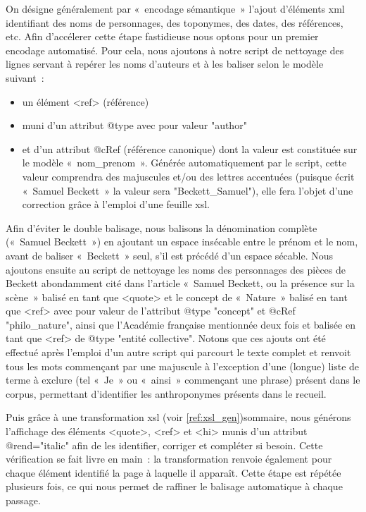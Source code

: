 \documentclass[12pt, a4paper]{article}
\begin{document}
On désigne généralement par «~encodage sémantique~» l'ajout d'éléments xml identifiant des noms de personnages, des toponymes, des dates, des références, etc. Afin d'accélerer cette étape fastidieuse nous optons pour un premier encodage automatisé. Pour cela, nous ajoutons à notre script de nettoyage des lignes servant à repérer les noms d'auteurs et à les baliser selon le modèle suivant~:
\begin{itemize}
    \item un élément <ref> (référence)
    \item muni d'un attribut @type avec pour valeur "author"
    \item et d'un attribut @cRef (référence canonique) dont la valeur est constituée sur le modèle «~nom_prenom~». Générée automatiquement par le script, cette valeur comprendra des majuscules et/ou des lettres accentuées (puisque \robbe{} écrit «~Samuel Beckett~» la valeur sera "Beckett_Samuel"), elle fera l'objet d'une correction grâce à l'emploi d'une feuille xsl.
\end{itemize}
Afin d'éviter le double balisage, nous balisons la dénomination complète («~Samuel Beckett~») en ajoutant un espace insécable entre le prénom et le nom, avant de baliser «~Beckett~» seul, s'il est précédé d'un espace sécable.
Nous ajoutons ensuite au script de nettoyage les noms des personnages des pièces de Beckett abondamment cité dans l'article « Samuel Beckett, ou la présence sur la scène » balisé en tant que <quote> et le concept de « Nature » balisé en tant que <ref> avec pour valeur de l'attribut @type "concept" et @cRef "philo_nature", ainsi que l'Académie française mentionnée deux fois et balisée en tant que <ref> de @type "entité collective". Notons que ces ajouts ont été effectué après l'emploi d'un autre script qui parcourt le texte complet et renvoit tous les mots commençant par une majuscule à l'exception d'une (longue) liste de terme à exclure (tel « Je » ou « ainsi » commençant une phrase) présent dans le corpus, permettant d'identifier les anthroponymes présents dans le recueil.


Puis grâce à une transformation xsl (voir \ref{ref:xsl_gen})sommaire, nous générons l'affichage des éléments <quote>, <ref> et <hi> munis d'un attribut @rend="italic" afin de les identifier, corriger et compléter si besoin. Cette vérification se fait livre en main~: la transformation renvoie également pour chaque élément identifié la page à laquelle il apparaît. Cette étape est répétée plusieurs fois, ce qui nous permet de raffiner le balisage automatique à chaque passage.
\end{document}
